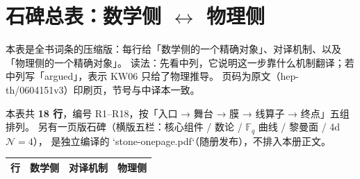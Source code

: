 \section{石碑总表：数学侧 $\leftrightarrow$ 物理侧}
\label{app:stone}

本表是全书词条的压缩版：每行给「数学侧的一个精确对象」、对译机制、以及「物理侧的一个精确对象」。
读法：先看中列，它说明这一步靠什么机制翻译；若中列写「argued」，表示 KW06 只给了物理推导。
页码为原文（hep-th/0604151v3）印刷页，节号与中译本一致。

本表共 {\bf 18 行}，编号 R1--R18，按「入口 → 舞台 → 膜 → 线算子 → 终点」五组排列。
另有一页版石碑（横版五栏：核心组件 / 数论 / $\mathbb F_q$ 曲线 / 黎曼面 / 4d $\mathcal N=4$），
是独立编译的 `stone-onepage.pdf`（随册发布），不排入本册正文。

\begingroup
\small
\begin{longtable}{@{}p{0.9cm}p{4.9cm}p{3.9cm}p{5.2cm}@{}}
\toprule
\textbf{行} & \textbf{数学侧} & \textbf{对译机制} & \textbf{物理侧} \\
\midrule
\endhead


\end{longtable}
